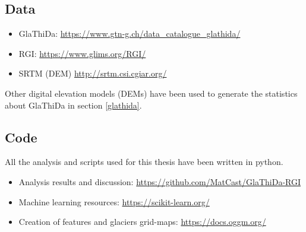 \subsection{Data}
\begin{itemize}
	\item GlaThiDa: \href{https://www.gtn-g.ch/data_catalogue_glathida/}{https://www.gtn-g.ch/data\_catalogue\_glathida/}
	\item RGI: \href{https://www.glims.org/RGI/}{https://www.glims.org/RGI/}
	\item SRTM (DEM) \href{http://srtm.csi.cgiar.org/}{http://srtm.csi.cgiar.org/}
\end{itemize}

Other digital elevation models (DEMs) have been used to generate the statistics about GlaThiDa in section \ref{glathida}.

\subsection{Code}
All the analysis and scripts used for this thesis have been written in python.
\begin{itemize}
	\item Analysis results and discussion: \href{https://github.com/MatCast/GlaThiDa-RGI}{https://github.com/MatCast/GlaThiDa-RGI}
	\item Machine learning resources: \href{https://scikit-learn.org/}{https://scikit-learn.org/}
	\item Creation of features and glaciers grid-maps: \href{https://docs.oggm.org/}{https://docs.oggm.org/}
\end{itemize}


 


